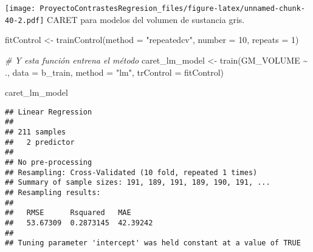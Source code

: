\documentclass[
]{article}
\newenvironment{Shaded}{\begin{snugshade}}{\end{snugshade}}
\newcommand{\AttributeTok}[1]{\textcolor[rgb]{0.77,0.63,0.00}{#1}}
\newcommand{\CommentTok}[1]{\textcolor[rgb]{0.56,0.35,0.01}{\textit{#1}}}
\newcommand{\ConstantTok}[1]{\textcolor[rgb]{0.00,0.00,0.00}{#1}}
\newcommand{\DecValTok}[1]{\textcolor[rgb]{0.00,0.00,0.81}{#1}}
\newcommand{\FunctionTok}[1]{\textcolor[rgb]{0.00,0.00,0.00}{#1}}
\newcommand{\NormalTok}[1]{#1}
\newcommand{\OtherTok}[1]{\textcolor[rgb]{0.56,0.35,0.01}{#1}}
\newcommand{\SpecialCharTok}[1]{\textcolor[rgb]{0.00,0.00,0.00}{#1}}
\newcommand{\StringTok}[1]{\textcolor[rgb]{0.31,0.60,0.02}{#1}}
\begin{document}
\texttt{[image: ProyectoContrastesRegresion\_files/figure-latex/unnamed-chunk-40-2.pdf]}
CARET para modelos del volumen de sustancia gris.

\begin{Shaded}
\end{Shaded}

\begin{Shaded}
\begin{Highlighting}[]
\NormalTok{fitControl }\OtherTok{\textless{}{-}} \FunctionTok{trainControl}\NormalTok{(}\AttributeTok{method =} \StringTok{"repeatedcv"}\NormalTok{,}
                           \AttributeTok{number =} \DecValTok{10}\NormalTok{,}
                           \AttributeTok{repeats =} \DecValTok{1}\NormalTok{)}

\CommentTok{\# Y esta función entrena el método}
\NormalTok{caret\_lm\_model }\OtherTok{\textless{}{-}} \FunctionTok{train}\NormalTok{(GM\_VOLUME }\SpecialCharTok{\textasciitilde{}}\NormalTok{ ., }
                        \AttributeTok{data =}\NormalTok{ b\_train, }
                        \AttributeTok{method =} \StringTok{"lm"}\NormalTok{,}
                        \AttributeTok{trControl =}\NormalTok{ fitControl)}
\end{Highlighting}
\end{Shaded}

\begin{Shaded}
\begin{Highlighting}[]
\NormalTok{caret\_lm\_model}
\end{Highlighting}
\end{Shaded}

\begin{verbatim}
## Linear Regression 
## 
## 211 samples
##   2 predictor
## 
## No pre-processing
## Resampling: Cross-Validated (10 fold, repeated 1 times) 
## Summary of sample sizes: 191, 189, 191, 189, 190, 191, ... 
## Resampling results:
## 
##   RMSE      Rsquared   MAE     
##   53.67309  0.2873145  42.39242
## 
## Tuning parameter 'intercept' was held constant at a value of TRUE
\end{verbatim}
\end{document}
